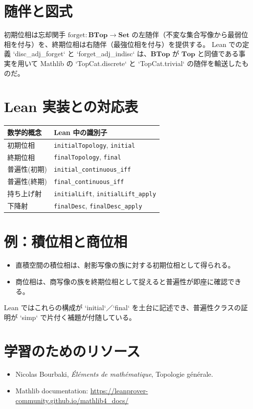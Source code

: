 \documentclass[]{jlreq}
\theoremstyle{definition}
\theoremstyle{remark}
\begin{document}
\section{随伴と図式}
初期位相は忘却関手 $\mathrm{forget} : \mathbf{BTop} \to \mathbf{Set}$ の左随伴（不変な集合写像から最弱位相を付与）を、終期位相は右随伴（最強位相を付与）を提供する。
Lean での定義 `disc_adj_forget` と `forget_adj_indisc` は、$\mathbf{BTop}$ が $\mathbf{Top}$ と同値である事実を用いて Mathlib の `TopCat.discrete` と `TopCat.trivial` の随伴を輸送したものだ。

\begin{center}
\end{center}

\section{Lean 実装との対応表}
\begin{center}
\begin{tabular}{ll}
\hline
数学的概念 & Lean 中の識別子 \\
\hline
初期位相 & \texttt{initialTopology}, \texttt{initial} \\
終期位相 & \texttt{finalTopology}, \texttt{final} \\
普遍性(初期) & \texttt{initial\_continuous\_iff} \\
普遍性(終期) & \texttt{final\_continuous\_iff} \\
持ち上げ射 & \texttt{initialLift}, \texttt{initialLift\_apply} \\
下降射 & \texttt{finalDesc}, \texttt{finalDesc\_apply} \\
\hline
\end{tabular}
\end{center}

\section{例：積位相と商位相}
\begin{itemize}
  \item 直積空間の積位相は、射影写像の族に対する初期位相として得られる。
  \item 商位相は、商写像の族を終期位相として捉えると普遍性が即座に確認できる。
\end{itemize}
Lean ではこれらの構成が `initial`／`final` を土台に記述でき、普遍性クラスの証明が `simp` で片付く補題が付随している。

\section{学習のためのリソース}
\begin{itemize}
  \item Nicolas Bourbaki, \textit{Éléments de mathématique}, Topologie générale.
  \item Mathlib documentation: \url{https://leanprover-community.github.io/mathlib4_docs/}
\end{itemize}
\end{document}
